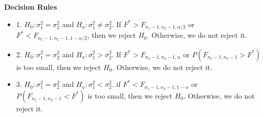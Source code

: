 \textbf{Decision Rules}

\begin{itemize}
	\item 1. $H_0: \sigma_1^2 = \sigma_2^2$ and $H_a:\sigma_1^2 \neq \sigma_2^2$. If $F^* > F_{n_1-1,n_2-1,\alpha/2}$ or $F^* < F_{n_1-1,n_2-1,1 - \alpha/2}$, then we reject $H_0$. Otherwise, we do not reject it.
	\item 2. $H_0: \sigma_1^2 = \sigma_2^2$ and $H_a: \sigma_1^2 > \sigma_2^2$. If $F^*> F_{n_1-1,n_2-1,\alpha}$ or $P(F_{n_1-1,n_2-1} > F^*)$ is too small, then we reject $H_0$. Otherwise, we do not reject it.
	\item 3. $H_0: \sigma_1^2 = \sigma_2^2$ and $H_a: \sigma_1^2 < \sigma_2^2$. if $F^* < F_{n_1-1,n_2-1,1-\alpha}$ or $P(F_{n_1-1,n_2-1} < F^*)$ is too small, then we reject $H_0$. Otherwise, we do not reject it.
\end{itemize}






